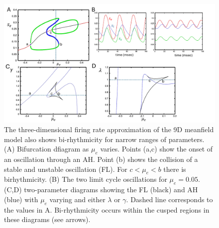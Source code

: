 \documentclass[10pt,letterpaper]{article}
\begin{document}
\begin{figure}
\includegraphics[width=.9\textwidth]{afig12.pdf}
\caption{The three-dimensional firing rate approximation of the 9D meanfield model also shows bi-rhythmicity for narrow ranges of parameters. (A) Bifurcation dfiagram as $\mu_e$ varies. Points (a,c) show the onset of an oscillation through an AH. Point (b) shows the collision of a stable and unstable oscillation (FL). For $c<\mu_e<b$ there is birhythmicity. (B) The two limit cycle oscillations for $\mu_e=0.05$. (C,D) two-parameter diagrams showing the FL (black) and AH (blue) with $\mu_e$ varying and either $\lambda$ or $\gamma$.  Dashed line corresponds to the values in A. Bi-rhythmicity occurs within the cusped regions in these diagrams (see arrows). }
\label{fig:9}
\end{figure}
\end{document}
